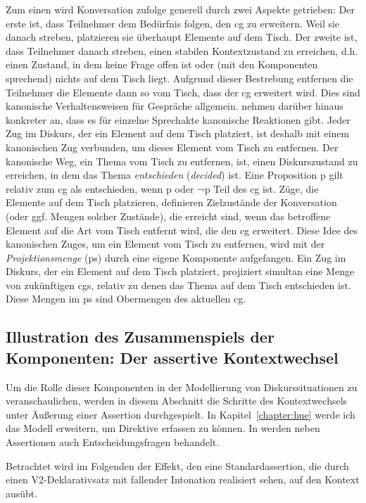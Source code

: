 Zum einen wird Konversation \citet{Farkas2010} zufolge generell durch zwei Aspekte getrieben: Der erste ist, dass Teilnehmer dem Bedürfnis folgen, den cg zu erweitern. Weil sie danach streben, platzieren sie überhaupt Elemente auf dem Tisch. Der zweite ist, dass Teilnehmer danach streben, einen stabilen Kontextzustand zu erreichen, d.h. einen Zustand, in dem keine Frage offen ist oder (mit den Komponenten sprechend) nichts auf dem Tisch liegt. Aufgrund dieser Bestrebung entfernen die Teilnehmer die Elemente dann so vom Tisch, dass der cg erweitert wird. Dies sind kanonische Verhaltensweisen für Gespräche allgemein. \citet{Farkas2010} nehmen darüber hinaus konkreter an, dass es für einzelne Sprechakte kanonische Reaktionen gibt. Jeder Zug im Diskurs, der ein Element auf dem Tisch platziert, ist deshalb mit einem kanonischen Zug verbunden, um dieses  Element vom Tisch zu entfernen. Der kanonische Weg, ein Thema vom Tisch zu entfernen, ist, einen Diskurszustand zu erreichen, in dem das Thema \textit{entschieden} (\textit{decided})  ist. Eine Proposition p gilt relativ zum cg als entschieden, wenn p oder ¬p Teil des cg ist.  Züge, die Elemente auf dem Tisch platzieren, definieren Zielzustände der Konversation (oder ggf. Mengen solcher Zustände), die erreicht sind, wenn das betroffene Element auf die Art vom Tisch entfernt wird, die den cg erweitert. Diese Idee des kanonischen Zuges, um ein Element vom Tisch zu entfernen, wird mit der \textit{Projektionsmenge} (ps)  durch eine eigene Komponente aufgefangen. Ein Zug im Diskurs, der ein Element auf dem Tisch platziert, projiziert simultan eine Menge von zukünftigen cgs, relativ zu denen das Thema auf dem Tisch entschieden ist. Diese Mengen im ps sind Obermengen des aktuellen cg. 

\subsection{Illustration des Zusammenspiels der Komponenten: Der assertive Kontextwechsel}
Um die Rolle dieser Komponenten in der Modellierung von Diskurssituationen zu veranschaulichen, werden in diesem Abschnitt die Schritte des Kontextwechsels unter Äußerung einer Assertion  durchgespielt. In Kapitel~\ref{chapter:hue} werde ich das Mo\-dell erweitern, um Direktive erfassen zu können. In \citet{Farkas2010} werden neben Assertionen auch Entscheidungsfragen behandelt.

Betrachtet wird im Folgenden der Effekt, den eine Standardassertion, die \citet{Farkas2010} durch einen V2-Deklarativsatz mit fallender Intonation realisiert sehen, auf den Kontext ausübt. 

